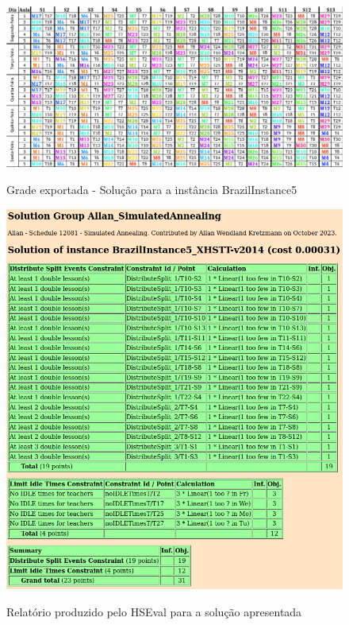 \begin{figure}[h]
	\centering
	\caption{Grade exportada - Solução para a instância BrazilInstance5}
	\includegraphics[width=1\textwidth]{./dados/figuras/brazilinstance5}
	\label{fig:brazilinstance5_solucao}
\end{figure}

\begin{figure}[h]
	\centering
	\caption{Relatório produzido pelo HSEval para a solução apresentada}
	\includegraphics[width=1\textwidth]{./dados/figuras/hseval_brazilinstance5}
	\label{fig:hseval_brazilinstance5}
\end{figure}


